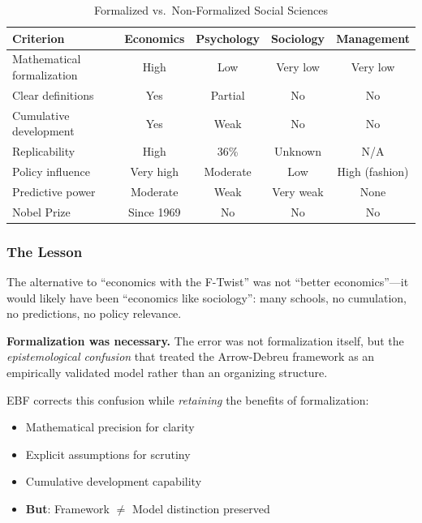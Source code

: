 \begin{table}[htbp]
\centering
\caption{Formalized vs.\ Non-Formalized Social Sciences}
\label{tab:comparative}
\renewcommand{\arraystretch}{1.3}
\small
\begin{tabular}{@{}lcccc@{}}
\toprule
\textbf{Criterion} & \textbf{Economics} & \textbf{Psychology} & \textbf{Sociology} & \textbf{Management} \\
\midrule
Mathematical formalization & High & Low & Very low & Very low \\
Clear definitions & Yes & Partial & No & No \\
Cumulative development & Yes & Weak & No & No \\
Replicability & High & 36\% & Unknown & N/A \\
Policy influence & Very high & Moderate & Low & High (fashion) \\
Predictive power & Moderate & Weak & Very weak & None \\
Nobel Prize & Since 1969 & No & No & No \\
\bottomrule
\end{tabular}
\end{table}

\subsubsection{The Lesson}

The alternative to ``economics with the F-Twist'' was not ``better economics''---it
would likely have been ``economics like sociology'': many schools, no cumulation,
no predictions, no policy relevance.

\textbf{Formalization was necessary.} The error was not formalization itself,
but the \textit{epistemological confusion} that treated the Arrow-Debreu framework
as an empirically validated model rather than an organizing structure.

EBF corrects this confusion while \textit{retaining} the benefits of formalization:
\begin{itemize}[nosep]
    \item Mathematical precision for clarity
    \item Explicit assumptions for scrutiny
    \item Cumulative development capability
    \item \textbf{But}: Framework $\neq$ Model distinction preserved
\end{itemize}



